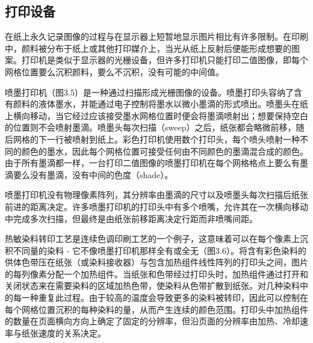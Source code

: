 \documentclass[lang=cn,12pt,marginpar=margintrue]{elegantbook}
\begin{document}
\subsection{打印设备}

在纸上永久记录图像的过程与在显示器上短暂地显示图片相比有许多限制。在印刷中，颜料被分布于纸上或其他打印媒介上，当光从纸上反射后便能形成想要的图案。打印机是类似于显示器的光栅设备，但许多打印机只能打印二值图像，即每个网格位置要么沉积颜料，要么不沉积，没有可能的中间值。


喷墨打印机（图3.5）是一种通过扫描形成光栅图像的设备。喷墨打印头容纳了含有颜料的液体墨水，并能通过电子控制将墨水以微小墨滴的形式喷出。喷墨头在纸上横向移动，当它经过应该接受墨水网格位置时便会将墨滴喷射出；想要保持空白的位置则不会喷射墨滴。喷墨头每次扫描（sweep）之后，纸张都会略微前移，随后网格的下一行被喷射到纸上。彩色打印机使用数个打印头，每个喷头喷射一种不同的颜色的墨水，因此每个网格位置可接受任何由不同颜色的墨滴混合成的颜色。由于所有墨滴都一样，一台打印二值图像的喷墨打印机在每个网格格点上要么有墨滴要么没有墨滴，没有中间的色度（shade）。


喷墨打印机没有物理像素阵列，其分辨率由墨滴的尺寸以及喷墨头每次扫描后纸张前进的距离决定。许多喷墨打印机的打印头中有多个喷嘴，允许其在一次横向移动中完成多次扫描，但最终是由纸张前移距离决定行距而非喷嘴间距。


热敏染料转印工艺是连续色调印刷工艺的一个例子，这意味着可以在每个像素上沉积不同量的染料 - 它不像喷墨打印机那样全有或全无（图3.6）。将含有彩色染料的供体色带压在纸张（或染料接收器）与包含加热组件线性阵列的打印头之间，图片的每列像素分配一个加热组件。当纸张和色带经过打印头时，加热组件通过打开和关闭状态来在需要染料的区域加热色带，使染料从色带扩散到纸张。对几种染料中的每一种重复此过程。由于较高的温度会导致更多的染料被转印，因此可以控制在每个网格位置沉积的每种染料的量，从而产生连续的颜色范围。打印头中加热组件的数量在页面横向方向上确定了固定的分辨率，但沿页面的分辨率由加热、冷却速率与纸张速度的关系决定。
\end{document}
